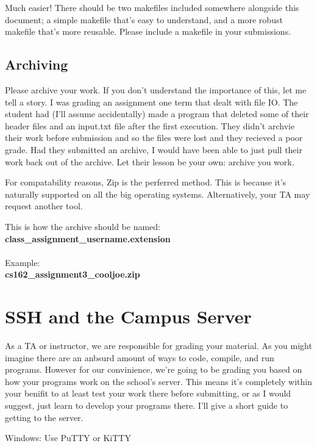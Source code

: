 \documentclass[letterpaper,10pt,titlepage,fleqn]{article}
\begin{document}
Much easier! There should be two makefiles included somewhere alongside this document; a simple
makefile that's easy to understand, and a more robust makefile that's more
reusable. Please include a makefile in your submissions. 


\subsection{Archiving}
Please archive your work. If you don't understand the importance of this, let me
tell a story. I was grading an assignment one term that dealt with file IO. The
student had (I'll assume accidentally) made a program that deleted some of their
header files and an input.txt file after the first execution. They didn't
archvie their work before submission and so the files were lost and they
recieved a poor grade. Had they submitted an archive, I would have been able to
just pull their work back out of the archive. Let their lesson be your own:
archive you work. 

For compatability reasons, Zip is the perferred method. This is because it's
naturally supported on all the big operating systems. Alternatively, your TA may
request another tool. 

This is how the archive should be named:\\
\textbf{class\_assignment\_username.extension}\\\\
Example:\\
\textbf{cs162\_assignment3\_cooljoe.zip}

\section{SSH and the Campus Server}

As a TA or instructor, we are responsible for grading your
material. As you might imagine there are an anbsurd amount of ways to code,
compile, and run programs. However for our convinience, we're going to be
grading you based on how your programs work on the school's server. This means
it's completely within your benifit to at least test your work there before
submitting, or as I would suggest, just learn to develop your programs there.
I'll give a short guide to getting to the server.

Windows: Use PuTTY or KiTTY
\end{document}
